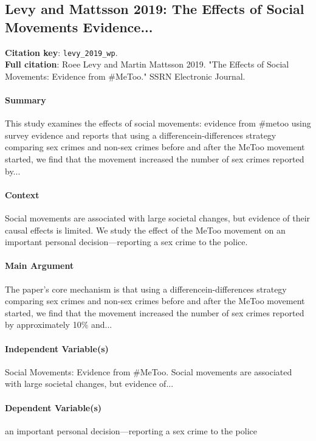 \documentclass[12pt]{article}
\begin{document}
\subsection{Levy and Mattsson 2019: The Effects of Social Movements Evidence...}
\textbf{Citation key}: \texttt{levy\_2019\_wp}.\\
\textbf{Full citation}: Roee Levy and Martin Mattsson 2019. "The Effects of Social Movements: Evidence from \#MeToo." SSRN Electronic Journal.

\paragraph{Summary} This study examines the effects of social movements: evidence from \#metoo using survey evidence and reports that using a differencein-differences strategy comparing sex crimes and non-sex crimes before and after the MeToo movement started, we find that the movement increased the number of sex crimes reported by...

\paragraph{Context} Social movements are associated with large societal changes, but evidence of their causal effects is limited. We study the effect of the MeToo movement on an important personal decision---reporting a sex crime to the police.

\paragraph{Main Argument} The paper's core mechanism is that using a differencein-differences strategy comparing sex crimes and non-sex crimes before and after the MeToo movement started, we find that the movement increased the number of sex crimes reported by approximately 10\% and...

\paragraph{Independent Variable(s)} Social Movements: Evidence from \#MeToo. Social movements are associated with large societal changes, but evidence of...

\paragraph{Dependent Variable(s)} an important personal decision---reporting a sex crime to the police
\end{document}
